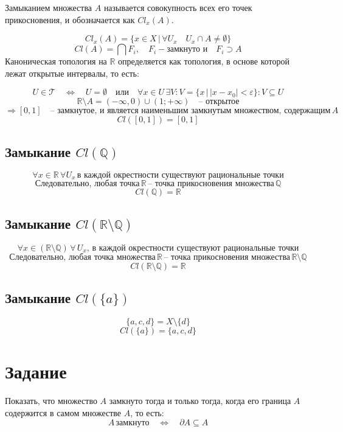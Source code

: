 \documentclass{article}
\begin{document}
Замыканием множества \( A \) называется совокупность всех его точек прикосновения, и обозначается как \( Cl_x(A) \).

\[
Cl_x(A) = \{x \in X \,|\, \forall U_x \quad U_x \cap A \neq \emptyset\}
\]
\[
Cl(A) = \bigcap F_i, \quad F_i - \text{замкнуто и} \quad F_i \supset A
\]
Каноническая топология на \( \mathbb{R} \) определяется как топология, в основе которой лежат открытые интервалы, то есть:

\[
U \in \mathcal{T} \quad \Longleftrightarrow \quad U = \emptyset \quad \text{или} \quad \forall x \in U \, \exists V : V = \{x \,|\, |x - x_0| < \varepsilon\} : V \subseteq U
\]
\[
\mathbb{R} \setminus A = (-\infty, 0) \cup (1; +\infty) \quad \text{– открытое}
\]
\[
\Rightarrow [0, 1] \quad \text{– замкнутое, и является наименьшим замкнутым множеством, содержащим} \, A
\]
\[
Cl([0, 1]) = [0, 1]
\]

\subsection*{Замыкание \( Cl(\mathbb{Q}) \)}
\[
\forall x \in \mathbb{R} \, \forall U_x \, \text{в каждой окрестности существуют рациональные точки}
\]
\[
\text{Следовательно, любая точка} \, \mathbb{R} \, \text{– точка прикосновения множества} \, \mathbb{Q}
\]
\[
Cl(\mathbb{Q}) = \mathbb{R}
\]

\subsection*{Замыкание \( Cl(\mathbb{R} \setminus \mathbb{Q}) \)}
\[
\forall x \in (\mathbb{R} \setminus \mathbb{Q}) \, \forall \, U_x, \, \text{в каждой окрестности существуют рациональные точки}
\]
\[
\text{Следовательно, любая точка множества} \, \mathbb{R} \, \text{– точка прикосновения множества} \, \mathbb{R} \setminus \mathbb{Q}
\]
\[
Cl(\mathbb{R} \setminus \mathbb{Q}) = \mathbb{R}
\]

\subsection*{Замыкание \( Cl(\{a\}) \)}
\[
\{a, c, d\} = X \setminus \{d\}
\]
\[
Cl(\{a\}) = \{a, c, d\}
\]

        
        \section*{Задание}
        Показать, что множество \( A \) замкнуто тогда и только тогда, когда его граница \(A\) содержится в самом множестве \(A\), то есть:
        \[
        A \, \text{замкнуто} \quad \Longleftrightarrow \quad \partial A \subseteq A
        \]
        
\end{document}
